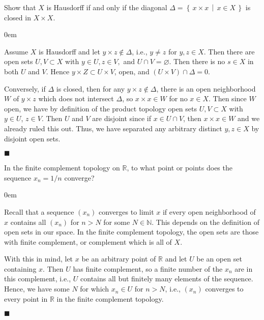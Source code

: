 \documentclass[12pt]{article}
\renewcommand{\qed}{\hfill$\blacksquare$}
\renewenvironment{proof}{\begin{addmargin}[1em]{0em}\begin{newproof}}{\end{newproof}\end{addmargin}\qed}
\newenvironment{problem}[2][Exercise]{\begin{trivlist}
\item[\hskip \labelsep {\bfseries #1}\hskip \labelsep {\bfseries #2.}]}{\end{trivlist}}
\begin{document}
\begin{problem}{17.13}
Show that $X$ is Hausdorff if and only if the diagonal $\Delta = \left\{\, x\times x\, \middle| \, x\in X \, \right\}$ is closed in $X \times X$.
\end{problem}
\begin{proof}
Assume $X$ is Hausdorff and let $y \times z \notin \Delta$, i.e., $y\neq z$ for $y,z \in X$. Then there are open sets $U,V \subset X$ with $y\in U, z\in V,$ and $U\cap V = \varnothing$. Then there is no $s\in X$ in both $U$ and $V$. Hence $y \times Z \subset U\times V$, open, and $\left(U\times V \right)\cap \Delta = 0$.

Conversely, if $\Delta$ is closed, then for any $y\times z \notin \Delta$, there is an open neighborhood $W$ of $y\times z$ which does not intersect $\Delta$, so $x \times x \in W$ for no $x \in X$. Then since $W$ open, we have by definition of the product topology open sets $U,V\subset X$ with $y \in U$, $z \in V$. Then $U $ and $V$ are disjoint since if $x \in U\cap V$, then $x\times x \in W$ and we already ruled this out. Thus, we have separated any arbitrary distinct $y,z \in X$ by disjoint open sets.
\end{proof}



\begin{problem}{17.14}
	In the finite complement topology on $\mathbb{R}$, to what point or points does the sequence $x_n = 1/n$ converge?
\end{problem}
\begin{proof}
	Recall that a sequence $\left(x_n\right)$ converges to limit $x$ if every open neighborhood of $x$ contains all $\left(x_n\right)$ for $n>N$ for some $N\in \mathbb{N}$. This depends on the definition of open sets in our space. In the finite complement topology, the open sets are those with finite complement, or complement which is all of $X$.
	
	With this in mind, let $x$ be an arbitrary point of $\mathbb{R}$ and let $U$ be an open set containing $x$. Then $U$ has finite complement, so a finite number of the $x_n$ are in this complement, i.e., $U$ contains all but finitely many elements of the sequence. Hence, we have some $N$ for which $x_n \in U$ for $n>N$, i.e., $\left(x_n\right)$ converges to every point in $\mathbb{R}$ in the finite complement topology.
\end{proof}
\end{document}
